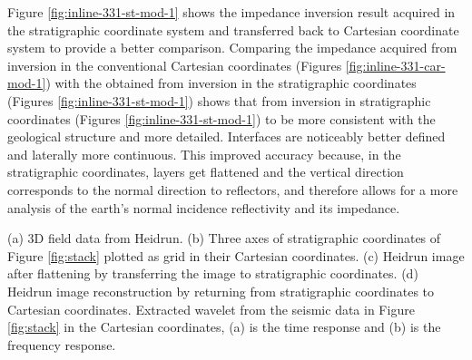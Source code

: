 Figure \ref{fig:inline-331-st-mod-1} shows the impedance inversion result acquired in the stratigraphic coordinate system and transferred back to Cartesian coordinate system to provide a better comparison.  Comparing the impedance acquired from inversion in the conventional Cartesian coordinates (Figures \ref{fig:inline-331-car-mod-1}) with the  obtained from inversion in the stratigraphic coordinates (Figures \ref{fig:inline-331-st-mod-1}) shows that  from inversion in stratigraphic coordinates (Figures \ref{fig:inline-331-st-mod-1})  to be more consistent with the geological structure and  more detailed. Interfaces are noticeably better defined and laterally more continuous. This improved accuracy  because, in the stratigraphic coordinates, layers get flattened and the vertical direction corresponds to the normal direction to reflectors, and therefore allows for a  more  analysis of the earth's normal incidence reflectivity and its impedance. 

{(a) 3D field data from Heidrun. (b) Three axes of stratigraphic coordinates of Figure \ref{fig:stack} plotted as grid in their Cartesian coordinates. (c) Heidrun image after flattening by transferring the image to stratigraphic coordinates. (d) Heidrun image reconstruction by returning from stratigraphic coordinates to Cartesian coordinates.}
{Extracted wavelet from the seismic data in Figure \ref{fig:stack} in the Cartesian coordinates, (a) is the time response and (b) is the frequency response.}

